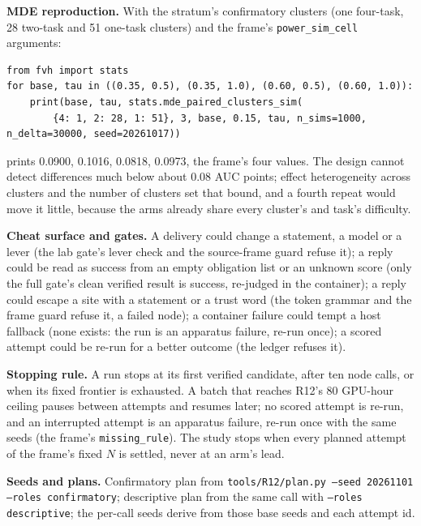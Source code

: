 \documentclass[11pt]{article}
\begin{document}
\begin{answer}
\textbf{MDE reproduction.} With the stratum's confirmatory clusters (one four-task, 28 two-task and 51 one-task clusters)
and the frame's \texttt{power\_sim\_cell} arguments:
\begin{verbatim}
from fvh import stats
for base, tau in ((0.35, 0.5), (0.35, 1.0), (0.60, 0.5), (0.60, 1.0)):
    print(base, tau, stats.mde_paired_clusters_sim(
        {4: 1, 2: 28, 1: 51}, 3, base, 0.15, tau, n_sims=1000, n_delta=30000, seed=20261017))
\end{verbatim}
prints 0.0900, 0.1016, 0.0818, 0.0973, the frame's four values. The design cannot detect
differences much below about 0.08 AUC points; effect heterogeneity across
clusters and the number of clusters set that bound, and a fourth repeat would move
it little, because the arms already share every cluster's and task's difficulty.

\textbf{Cheat surface and gates.} A delivery could change a statement, a model or a
lever (the lab gate's lever check and the source-frame guard refuse it); a reply
could be read as success from an empty obligation list or an unknown score (only
the full gate's clean verified result is success, re-judged in the container); a
reply could escape a site with a statement or a trust word (the token grammar and
the frame guard refuse it, a failed node); a container failure could tempt a host
fallback (none exists: the run is an apparatus failure, re-run once); a scored
attempt could be re-run for a better outcome (the ledger refuses it).

\textbf{Stopping rule.} A run stops at its first verified candidate, after ten node
calls, or when its fixed frontier is exhausted. A batch that reaches R12's 80
GPU-hour ceiling pauses between attempts and resumes later; no scored attempt is
re-run, and an interrupted attempt is an apparatus failure, re-run once with
the same seeds (the frame's \texttt{missing\_rule}). The study stops when
every planned attempt of the frame's fixed $N$ is settled, never at an arm's lead.

\textbf{Seeds and plans.} Confirmatory plan from \texttt{tools/R12/plan.py --seed
20261101 --roles confirmatory}; descriptive plan from the same call with
\texttt{--roles descriptive}; the per-call seeds derive from those base seeds and
each attempt id.


\end{answer}
\end{document}
